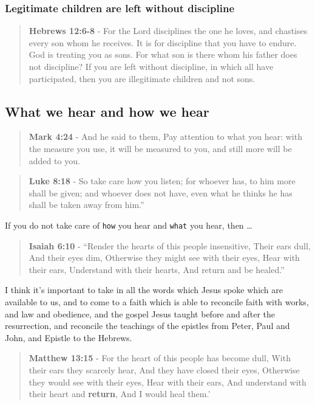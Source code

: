 \documentclass[11pt]{article}
\begin{document}
\subsubsection{Legitimate children are left without discipline}
\label{sec:org29a07e7}
\begin{quote}
\textbf{Hebrews 12:6-8} - For the Lord disciplines the one he loves, and chastises every son whom he receives. It is for discipline that you have to endure. God is treating you as sons. For what son is there whom his father does not discipline? If you are left without discipline, in which all have participated, then you are illegitimate children and not sons.
\end{quote}

\subsection{What we hear and how we hear}
\label{sec:orgaa73de1}
\begin{quote}
\textbf{Mark 4:24} - And he said to them, Pay attention to what you hear: with the measure you use, it will be measured to you, and still more will be added to you.
\end{quote}

\begin{quote}
\textbf{Luke 8:18} - So take care how you listen; for whoever has, to him more shall be given; and whoever does not have, even what he thinks he has shall be taken away from him.”
\end{quote}

If you do not take care of \texttt{how} you hear and \texttt{what} you hear, then \ldots{}

\begin{quote}
\textbf{Isaiah 6:10} - “Render the hearts of this people insensitive, Their ears dull, And their eyes dim, Otherwise they might see with their eyes, Hear with their ears, Understand with their hearts, And return and be healed.”
\end{quote}

I think it's important to take in all the words which Jesus spoke which are available to us, and to come to a faith which is able to reconcile faith with works, and law and obedience, and the gospel Jesus taught before and after the resurrection, and reconcile the teachings of the epistles from Peter, Paul and John, and Epistle to the Hebrews.

\begin{quote}
\textbf{Matthew 13:15} - For the heart of this people has become dull, With their ears they scarcely hear, And they have closed their eyes, Otherwise they would see with their eyes, Hear with their ears, And understand with their heart and \textbf{return}, And I would heal them.’
\end{quote}
\end{document}
